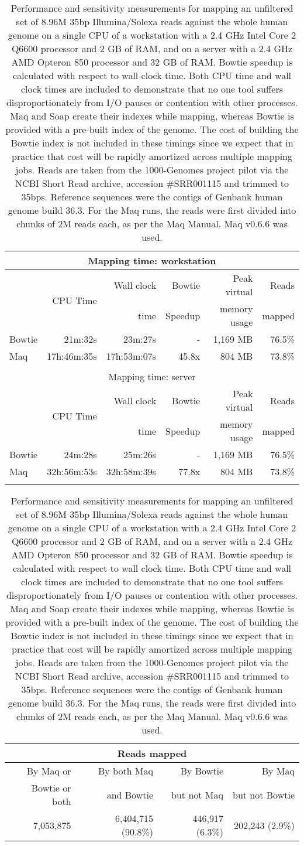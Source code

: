 \documentclass[letterpaper]{article}
\begin{document}
\begin{table}[tp]
\scriptsize
\begin{tabular}{lrrrrr}
\multicolumn{6}{c}{\small{Mapping time: workstation}} \\[3pt]
\toprule
 & \multirow{2}{*}{CPU Time} & Wall clock & Bowtie  & Peak virtual & Reads  \\
 &                            & time       & Speedup & memory usage & mapped \\[3pt]
\toprule
Bowtie & 21m:32s & 23m:27s & - & 1,169 MB & 76.5\%\\\midrule
Maq & 17h:46m:35s & 17h:53m:07s & 45.8x & 804 MB & 73.8\%\\
\toprule\\[1pt]
\multicolumn{6}{c}{\small{Mapping time: server}} \\[3pt]
\toprule
 & \multirow{2}{*}{CPU Time} & Wall clock & Bowtie  & Peak virtual & Reads  \\
 &                            & time       & Speedup & memory usage & mapped \\[3pt]
\toprule
Bowtie & 24m:28s & 25m:26s & - & 1,169 MB & 76.5\%\\\midrule
Maq & 32h:56m:53s & 32h:58m:39s & 77.8x & 804 MB & 73.8\%\\
\bottomrule\\[1pt]
\end{tabular}
\begin{tabular}{rrrr}
\multicolumn{4}{c}{\small{Reads mapped}} \\[3pt]
\toprule 
By Maq or      & By both Maq & By Bowtie   & By Maq         \\ 
Bowtie or both & and Bowtie  & but not Maq & but not Bowtie \\ 
\toprule
7,053,875 & 6,404,715 (90.8\%) & 446,917 (6.3\%) & 202,243 (2.9\%) \\ 
\bottomrule
\end{tabular}
\caption{Performance and sensitivity measurements for mapping an unfiltered
set of 8.96M 35bp Illumina/Solexa reads
against the whole human genome on a single CPU of a workstation with a 2.4 GHz
Intel Core 2 Q6600 processor and 2 GB of RAM, and on a server with a 2.4 GHz
AMD Opteron 850 processor and 32 GB of RAM. Bowtie speedup is calculated with
respect to wall clock time. Both CPU time and wall clock times are included to
demonstrate that no one tool suffers disproportionately from I/O pauses or
contention with other processes. Maq and Soap create their indexes
while mapping, whereas Bowtie is provided with a pre-built index of the
genome.  The cost of building the Bowtie index is not included in these timings
since we expect that in practice that cost will be rapidly amortized across
multiple mapping jobs. Reads are taken from the 1000-Genomes project pilot via
the NCBI Short Read archive, accession \#SRR001115 and trimmed to 35bps.
Reference sequences were the contigs of Genbank human genome build 36.3. For
the Maq runs, the reads were first
divided into chunks of 2M reads each, as per the Maq Manual. Maq
v0.6.6 was used. }
\end{table}
\end{document}
